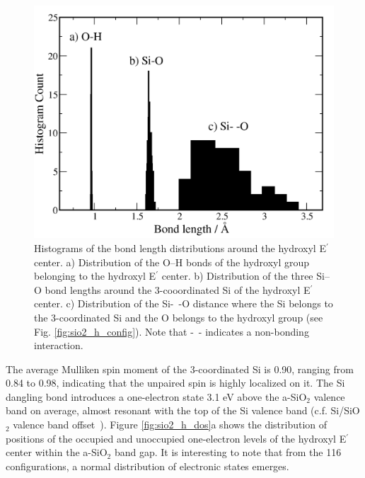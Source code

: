 \documentclass[aps,prb,reprint,superscriptaddress,showpacs]{revtex4-1}
\begin{document}
\begin{figure}
\includegraphics{hydroxyl_eprime_distribution.png}
\caption{Histograms of the bond length distributions around the hydroxyl E$^\prime$ center. a) Distribution of the \mbox{O--H} bonds of the hydroxyl group belonging to the hydroxyl E$^\prime$ center. b) Distribution of the three \mbox{Si--O} bond lengths around the 3-cooordinated Si of the hydroxyl E$^\prime$ center. c) Distribution of the \mbox{Si- -O} distance where the Si belongs to the 3-coordinated Si and the O belongs to the hydroxyl group (see Fig. \ref{fig:sio2_h_config}). Note that \mbox{- -} indicates a non-bonding interaction. }
\label{fig:hydroxyl_geometry}
\end{figure}

The average Mulliken spin moment of the 3-coordinated Si is 0.90, ranging from 0.84 to 0.98, indicating that the unpaired spin is highly localized on it. The Si dangling bond introduces a one-electron state 3.1 eV above the a-SiO$_2$ valence band on average, almost resonant with the top of the Si valence band (c.f. Si/SiO$_2$ valence band offset~\cite{sisio2_vb_offset}). Figure \ref{fig:sio2_h_dos}a shows the distribution of positions of the occupied and unoccupied one-electron levels of the hydroxyl E$^\prime$ center within the a-SiO$_2$ band gap. It is interesting to note that from the 116 configurations, a normal distribution of electronic states emerges. 
\end{document}
